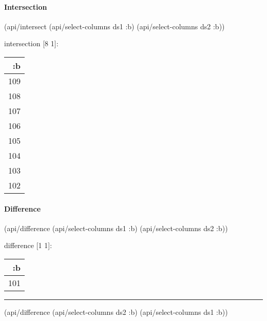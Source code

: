 \documentclass[]{article}
\newenvironment{Shaded}{\begin{snugshade}}{\end{snugshade}}
\newcommand{\AttributeTok}[1]{\textcolor[rgb]{0.77,0.63,0.00}{#1}}
\newcommand{\NormalTok}[1]{#1}
\let\oldparagraph\paragraph
\renewcommand{\paragraph}[1]{\oldparagraph{#1}\mbox{}}
\begin{document}
\paragraph{Intersection}\label{intersection}

\begin{Shaded}
\begin{Highlighting}[]
\NormalTok{(api/intersect (api/select-columns ds1 }\AttributeTok{:b}\NormalTok{)}
\NormalTok{               (api/select-columns ds2 }\AttributeTok{:b}\NormalTok{))}
\end{Highlighting}
\end{Shaded}

intersection {[}8 1{]}:

\begin{longtable}[]{@{}r@{}}
\toprule
:b\tabularnewline
\midrule
\endhead
109\tabularnewline
108\tabularnewline
107\tabularnewline
106\tabularnewline
105\tabularnewline
104\tabularnewline
103\tabularnewline
102\tabularnewline
\bottomrule
\end{longtable}

\paragraph{Difference}\label{difference}

\begin{Shaded}
\begin{Highlighting}[]
\NormalTok{(api/difference (api/select-columns ds1 }\AttributeTok{:b}\NormalTok{)}
\NormalTok{                (api/select-columns ds2 }\AttributeTok{:b}\NormalTok{))}
\end{Highlighting}
\end{Shaded}

difference {[}1 1{]}:

\begin{longtable}[]{@{}r@{}}
\toprule
:b\tabularnewline
\midrule
\endhead
101\tabularnewline
\bottomrule
\end{longtable}

\begin{center}\rule{0.5\linewidth}{0.5pt}\end{center}

\begin{Shaded}
\begin{Highlighting}[]
\NormalTok{(api/difference (api/select-columns ds2 }\AttributeTok{:b}\NormalTok{)}
\NormalTok{                (api/select-columns ds1 }\AttributeTok{:b}\NormalTok{))}
\end{Highlighting}
\end{Shaded}
\end{document}
